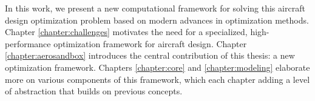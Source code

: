 In this work, we present a new computational framework for solving this aircraft design optimization problem based on modern advances in optimization methods. Chapter \ref{chapter:challenges} motivates the need for a specialized, high-performance optimization framework for aircraft design. Chapter \ref{chapter:aerosandbox} introduces the central contribution of this thesis: a new optimization framework. Chapters \ref{chapter:core} and \ref{chapter:modeling} elaborate more on various components of this framework, which each chapter adding a level of abstraction that builds on previous concepts.


%
%
%
